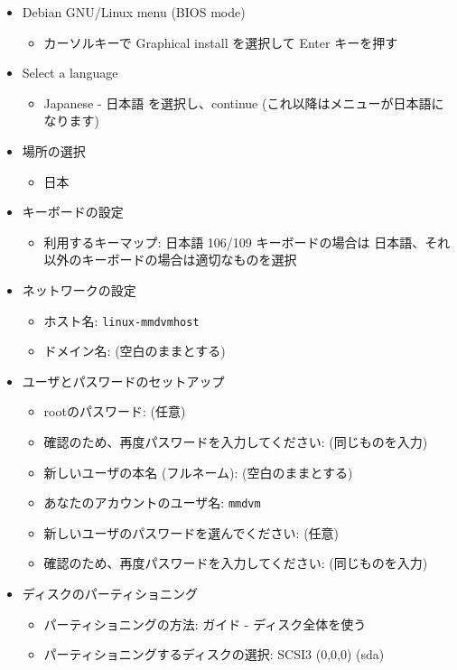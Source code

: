 \documentclass[a4j,oneside]{ujbook}
\begin{document}
\begin{itemize}
 \item Debian GNU/Linux menu (BIOS mode)
 \begin{itemize}
  \item カーソルキーで Graphical install を選択して Enter キーを押す
 \end{itemize}
 \item Select a language
 \begin{itemize}
  \item Japanese - 日本語 を選択し、continue (これ以降はメニューが日本語になります)
 \end{itemize}
 \item 場所の選択
 \begin{itemize}
  \item 日本
 \end{itemize}
 \item キーボードの設定
 \begin{itemize}
  \item 利用するキーマップ: 日本語 106/109 キーボードの場合は 日本語、それ以外のキーボードの場合は適切なものを選択
 \end{itemize}
 \item ネットワークの設定
 \begin{itemize}
  \item ホスト名: \verb+linux-mmdvmhost+
  \item ドメイン名: (空白のままとする)
 \end{itemize}
 \item ユーザとパスワードのセットアップ
 \begin{itemize}
  \item rootのパスワード: (任意)
  \item 確認のため、再度パスワードを入力してください: (同じものを入力)
  \item 新しいユーザの本名 (フルネーム): (空白のままとする)
  \item あなたのアカウントのユーザ名: \verb+mmdvm+
  \item 新しいユーザのパスワードを選んでください: (任意)
  \item 確認のため、再度パスワードを入力してください: (同じものを入力)
 \end{itemize}
 \item ディスクのパーティショニング
 \begin{itemize}
  \item パーティショニングの方法: ガイド - ディスク全体を使う
  \item パーティショニングするディスクの選択: SCSI3 (0,0,0) (sda)

\end{itemize}
\end{itemize}
\end{document}
